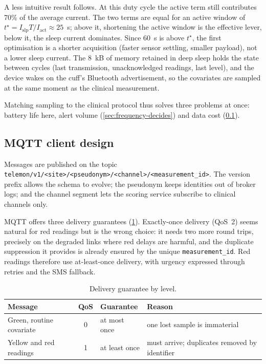 A less intuitive result follows. At this duty cycle the active term still contributes 70\% of the average current. The two terms are equal for an active window of $t^\star = I_{\text{slp}}T/I_{\text{act}} \approx 25$~s; above it, shortening the active window is the effective lever, below it, the sleep current dominates. Since 60~s is above $t^\star$, the first optimisation is a shorter acquisition (faster sensor settling, smaller payload), not a lower sleep current. The 8~kB of memory retained in deep sleep holds the state between cycles (last transmission, unacknowledged readings, last level), and the device wakes on the cuff's Bluetooth advertisement, so the covariates are sampled at the same moment as the clinical measurement.

Matching sampling to the clinical protocol thus solves three problems at once: battery life here, alert volume (\cref{sec:frequency-decides}) and data cost (\cref{sec:mqtt-design}).

\subsection{MQTT client design}\label{sec:mqtt-design}\label{sec:qos}\label{sec:mqtt-payload}

Messages are published on the topic \texttt{telemon/v1/<site>/<pseudonym>/<channel>/<measurement\_id>}. The version prefix allows the schema to evolve; the pseudonym keeps identities out of broker logs; and the channel segment lets the scoring service subscribe to clinical channels only.

MQTT offers three delivery guarantees (\cref{tab:qos}). Exactly-once delivery (QoS~2) seems natural for red readings but is the wrong choice: it needs two more round trips, precisely on the degraded links where red delays are harmful, and the duplicate suppression it provides is already ensured by the unique \texttt{measurement\_id}. Red readings therefore use at-least-once delivery, with urgency expressed through retries and the SMS fallback.

\begin{table}[htbp]
\centering\small
\caption{Delivery guarantee by level.}\label{tab:qos}
\begin{tabularx}{\textwidth}{@{}>{\raggedright\arraybackslash}p{3.4cm} c >{\raggedright\arraybackslash}p{2.6cm} X@{}}
\toprule
\textbf{Message} & \textbf{QoS} & \textbf{Guarantee} & \textbf{Reason} \\
\midrule
Green, routine covariate & 0 & at most once & one lost sample is immaterial \\
Yellow and red readings & 1 & at least once & must arrive; duplicates removed by identifier \\
\bottomrule
\end{tabularx}
\end{table}


